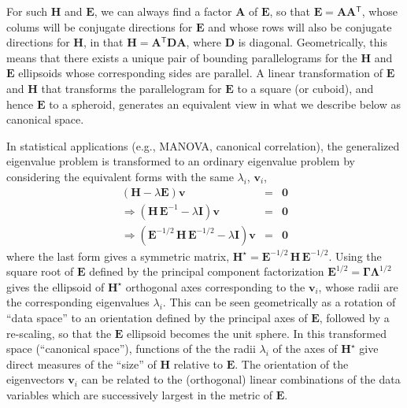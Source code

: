 \documentclass[11pt]{article}%
\renewcommand*{\vec}[1]{\ensuremath{\bm{#1}}}
\newcommand{\trans}{\ensuremath{^\mathsf{T}}}
\newcommand*{\mat}[1]{\ensuremath{\bm{#1}}}
\newcommand*{\inv}[1]{\ensuremath{\mat{#1}^{-1}}}
\newcommand*{\half}[1]{\ensuremath{\mat{#1}^{1/2}}}
\newcommand*{\invhalf}[1]{\ensuremath{\mat{#1}^{-1/2}}}
\begin{document}
For such \mat{H} and \mat{E}, we can always find a factor \mat{A} of \mat{E}, so that
$\mat{E} = \mat{A} \mat{A}\trans$, whose colums will be conjugate directions for \mat{E}
and whose rows will also be conjugate directions for \mat{H}, in that $\mat{H} = \mat{A}\trans \mat{D} \mat{A}$,
where $\mat{D}$ is diagonal.  Geometrically, this means that there exists a unique pair of
bounding parallelograms for the \mat{H} and \mat{E} ellipsoids whose 
corresponding sides are parallel. A linear transformation of \mat{E} and \mat{H}
that transforms the parallelogram
for \mat{E} to a square (or cuboid), and hence \mat{E} to a spheroid, generates an
equivalent view in what we describe below as canonical space.


In statistical applications (e.g., MANOVA, canonical correlation), the generalized
eigenvalue problem is transformed to an ordinary eigenvalue problem by considering
the equivalent forms with the same $\lambda_i$, $\vec{v}_i$,
\begin{eqnarray*}
(\mat{H} - \lambda \mat{E}) \vec{v} & = & \vec{0} \\ 
\Rightarrow (\mat{H} \, \inv{\mat{E}} - \lambda \mat{I}) \vec{v} & = & \vec{0} \\
\Rightarrow (\invhalf{\mat{E}} \, \mat{H} \, \invhalf{\mat{E}} - \lambda \mat{I}) \vec{v} & = & \vec{0}
\end{eqnarray*}
where the last form gives a symmetric matrix, $\mat{H}^\star = \invhalf{E} \, \mat{H} \, \invhalf{E}$.
Using the square root of \mat{E} defined by the
principal component factorization $\half{E} = \mat{\Gamma} \half{\mat{\Lambda}}$ gives 
the ellipsoid of $\mat{H}^\star$
orthogonal axes corresponding to the $\vec{v}_i$, whose radii are the corresponding
eigenvalues $\lambda_i$.  This can be seen geometrically as a rotation of ``data space''
to an orientation defined by the principal axes of \mat{E}, followed by a re-scaling, so
that the \mat{E} ellipsoid becomes the unit sphere.  In this transformed space
(``canonical space''), functions of the 
the radii $\lambda_i$ of the axes of $\mat{H}^\star$ give direct measures of
the ``size'' of \mat{H} relative to \mat{E}. The orientation of the eigenvectors
$\vec{v}_i$ can be related to the (orthogonal) linear combinations of the 
data variables which are successively largest in the metric of \mat{E}.
\end{document}

